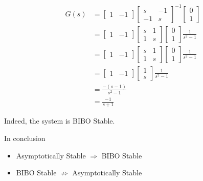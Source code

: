 \documentclass[twoside]{article}
\begin{document}
\begin{align*}
  G(s) &= \left[ \begin{array}{cc} 1 & -1 \end{array} \right]
\left[ \begin{array}{cc} s & -1 \\ -1 & s\end{array}
                                                                  \right]^{-1}
\left[ \begin{array}{c} 0 \\ 1 \end{array} \right]
\\
&=
\left[ \begin{array}{cc} 1 & -1 \end{array} \right]
\left[ \begin{array}{cc} s & 1 \\ 1 & s\end{array}
                                                                  \right]
\left[ \begin{array}{c} 0 \\ 1 \end{array} \right] \frac{1}{s^2 - 1}
\\
&=
\left[ \begin{array}{cc} 1 & -1 \end{array} \right]
\left[ \begin{array}{cc} s & 1 \\ 1 & s\end{array}
                                                                  \right]
\left[ \begin{array}{c} 0 \\ 1 \end{array} \right] \frac{1}{s^2 - 1}
\\
&=
\left[ \begin{array}{cc} 1 & -1 \end{array} \right]
\left[ \begin{array}{c} 1 \\ s \end{array} \right] \frac{1}{s^2 - 1}
\\
&= \frac{-(s-1)}{s^2 - 1} 
\\
&= \frac{-1}{s + 1} 
\end{align*}

Indeed, the system is BIBO Stable.

In conclusion

\begin{itemize}
  \item Asymptotically Stable $\Rightarrow$ BIBO Stable
  \item BIBO Stable $\not\Rightarrow$ Asymptotically Stable
\end{itemize} 
\end{document}
